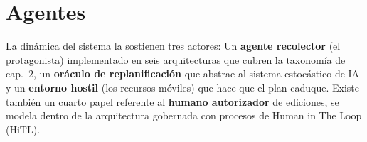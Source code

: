 \section{Agentes}

La dinámica del sistema la sostienen tres actores: Un \textbf{agente recolector} (el protagonista) implementado en seis arquitecturas que cubren la taxonomía de \textcite{russellNorvig2020} cap.~2, un \textbf{oráculo de replanificación} que abstrae al sistema estocástico de IA y un \textbf{entorno hostil} (los recursos móviles) que hace que el plan caduque. Existe también un cuarto papel referente al \textbf{humano autorizador} de ediciones, se modela dentro de la arquitectura gobernada con procesos de Human in The Loop (HiTL).

